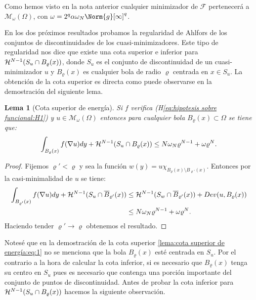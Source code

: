 \documentclass[a4paper,11pt,spanish, twoside, leqno]{tfm-uam}
\newtheorem{lema}[teo]{Lema}
\begin{document}
Como hemos visto en la nota anterior cualquier minimizador de $\mathcal{F}$ pertenecerá a $\mathcal{M}_{\omega}(\Omega)$, con $\omega=2^{q}\alpha\omega_{N}\Norm{g}[\infty]^{q}$.

En los dos próximos resultados probamos la regularidad de Ahlfors de los conjuntos de discontinuidades de los cuasi-minimizadores. Este tipo de regularidad nos dice que existe una cota superior e inferior para $\mathcal{H}^{N-1}(S_{u}\cap B_{\varrho}(x))$, donde $S_{u}$ es el conjunto de discontinuidad de un cuasi-minimizador $u$ y $B_{\varrho}(x)$ es cualquier bola de radio $\varrho$ centrada en $x\in S_{u}$. La obtención de la cota superior es directa como puede observarse en la demostración del siguiente lema.
\begin{lema}[Cota superior de energía]\label{lema:cota superior de energía}
Si $f$ verifica (H\ref{eq:hipotesis sobre funcional:H1}) y $u\in \mathcal{M}_{\omega}(\Omega)$ entonces para cualquier bola $B_{\varrho}(x)\subset \Omega$ se tiene que:
\begin{align}\label{lema:cota superior de energía:eq:1}
\int_{B_{\varrho}(x)}f(\nabla{u})dy+\mathcal{H}^{N-1}(S_{u}\cap B_{\varrho}(x))\leq N\omega_{N}\varrho^{N-1}+\omega\varrho^{N}.
\end{align}
\end{lema}
\begin{proof}
Fijemos $\varrho'<\varrho$ y sea la función $w(y)=u\chi_{B_{\varrho}(x)\setminus B_{\varrho'}(x)}$. Entonces por la casi-minimalidad de $u$ se tiene:
\begin{align*}
\int_{B_{\varrho'}(x)}f(\nabla{u})dy+\mathcal{H}^{N-1}(S_{u}\cap \overline{B}_{\varrho'}(x))&\leq \mathcal{H}^{N-1}(S_{w}\cap \overline{B}_{\varrho'}(x))+Dev(u,B_{\varrho}(x))
\\&\leq N\omega_{N}\varrho^{N-1}+\omega\varrho^{N}.
\end{align*}
Haciendo tender $\varrho'\to \varrho$ obtenemos el resultado.
\end{proof}

Notesé que en la demostración de la cota superior \ref{lema:cota superior de energía:eq:1} no se menciona que la bola $B_{\varrho}(x)$ esté centrada en $S_{u}$. Por el contrario a la hora de calcular la cota inferior, si es necesario que $B_{\varrho}(x)$ tenga su centro en $S_{u}$ pues es necesario que contenga una porción importante del conjunto de puntos de discontinuidad. Antes de probar la cota inferior para $\mathcal{H}^{N-1}(S_{u}\cap B_{\varrho}(x))$ hacemos la siguiente observación.
\end{document}
